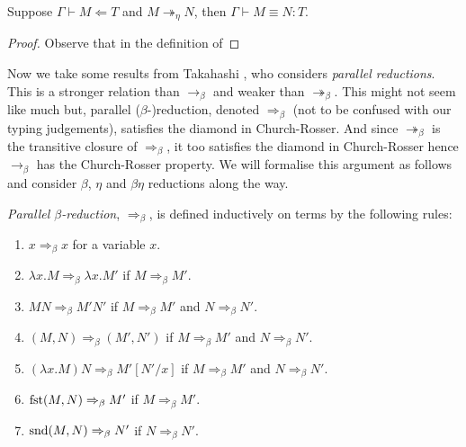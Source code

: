 \begin{comment}
\begin{proof}
    By definition $\partial_{\eta}(r)= \max(\partial(T), \partial(U))+1$ for some types $U$ and $V$ such that $T = U \times V$ or $T = U \to V$. Hence 
\end{proof}


\begin{lemma}
    $\eta$-reduction is weakly normalising.
\end{lemma}

\begin{lemma}
    $\eta$-reduction is strongly normalising.
\end{lemma}
\end{comment}

\begin{lemma}
    Suppose $\Gamma \vdash M \Leftarrow T$ and $M \twoheadrightarrow_{\eta} N$, then $\Gamma \vdash M \equiv N : T$.
\end{lemma}

\begin{proof}
    Observe that in the definition of 
\end{proof}

Now we take some results from Takahashi \cite{TakahashiM1989PRIL, Takahashi:1995:PR9:207177.207191}, who considers \emph{parallel reductions}. This is a stronger relation than $\to_{\beta}$ and weaker than $\twoheadrightarrow_{\beta}$. This might not seem like much but, parallel ($\beta$-)reduction, denoted $\Rightarrow_{\beta}$ (not to be confused with our typing judgements), satisfies the diamond in Church-Rosser. And since $\twoheadrightarrow_{\beta}$ is the transitive closure of $\Rightarrow_{\beta}$, it too satisfies the diamond in Church-Rosser hence $\to_{\beta}$ has the Church-Rosser property. We will formalise this argument as follows and consider $\beta$, $\eta$ and $\beta \eta$ reductions along the way.

\begin{defin}
    \emph{Parallel $\beta$-reduction}, $\Rightarrow_{\beta}$, is defined inductively on terms by the following rules:
    \begin{enumerate}
        \item $x \Rightarrow_{\beta} x$ for a variable $x$.
        \item $\lambda x . M \Rightarrow_{\beta} \lambda x . M'$ if $M \Rightarrow_{\beta} M'$.
        \item $MN \Rightarrow_{\beta} M' N'$ if $M \Rightarrow_{\beta} M'$ and $N \Rightarrow_{\beta} N'$.
        \item $(M, N) \Rightarrow_{\beta} (M', N')$ if $M \Rightarrow_{\beta} M'$ and $N \Rightarrow_{\beta} N'$.
        \item $(\lambda x . M)N \Rightarrow_{\beta} M'[N' / x]$ if $M \Rightarrow_{\beta} M'$ and $N \Rightarrow_{\beta} N'$.
        \item $\mathrm{fst}(M, N) \Rightarrow_{\beta} M'$ if $M \Rightarrow_{\beta} M'$.
        \item $\mathrm{snd}(M, N) \Rightarrow_{\beta} N'$ if $N \Rightarrow_{\beta} N'$.
    \end{enumerate}
\end{defin}

